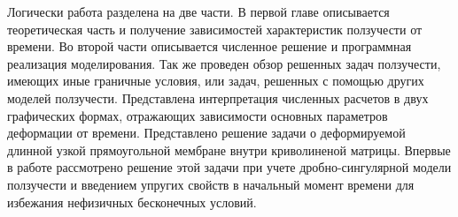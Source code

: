  Логически работа разделена на две части. В первой главе описывается теоретическая часть и 
получение зависимостей характеристик ползучести от времени. Во второй части описывается численное решение и программная реализация моделирования. Так же проведен обзор решенных задач ползучести, имеющих иные граничные условия, или задач, решенных с помощью других моделей ползучести. Представлена интерпретация численных расчетов в двух графических формах, отражающих зависимости основных параметров деформации от времени. Представлено решение задачи о деформируемой длинной узкой прямоугольной мембране внутри криволиненой матрицы.
Впервые в работе рассмотрено решение этой задачи при учете дробно-сингулярной модели ползучести и введением упругих свойств в начальный момент времени для избежания нефизичных бесконечных условий. 